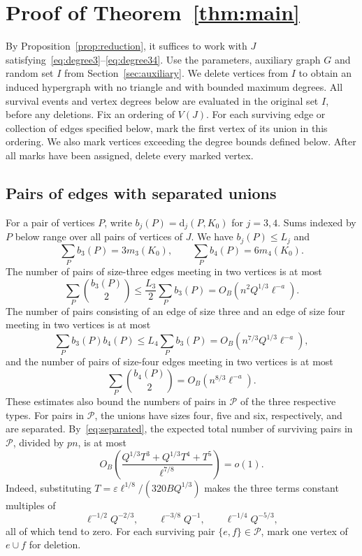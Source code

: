 \documentclass[11pt]{article}
\numberwithin{equation}{section}
\theoremstyle{remark}
\newcommand{\dd}{\mathrm d}
\begin{document}
\section{Proof of Theorem~\ref{thm:main}}\label{sec:completion}

By Proposition~\ref{prop:reduction}, it suffices to work with $J$ satisfying~\eqref{eq:degree3}--\eqref{eq:degree34}. Use the parameters, auxiliary graph $G$ and random set $I$ from Section~\ref{sec:auxiliary}. We delete vertices from $I$ to obtain an induced hypergraph with no triangle and with bounded maximum degrees. All survival events and vertex degrees below are evaluated in the original set $I$, before any deletions. Fix an ordering of $V(J)$. For each surviving edge or collection of edges specified below, mark the first vertex of its union in this ordering. We also mark vertices exceeding the degree bounds defined below. After all marks have been assigned, delete every marked vertex.

\subsection{Pairs of edges with separated unions}
For a pair of vertices $P$, write $b_j(P)=\dd_j(P,K_0)$ for $j=3,4$. Sums indexed by $P$ below range over all pairs of vertices of $J$. We have $b_j(P)\le L_j$ and
\[
 \sum_P b_3(P)=3m_3(K_0),\qquad
 \sum_P b_4(P)=6m_4(K_0).
\]
The number of pairs of size-three edges meeting in two vertices is at most
\[
 \sum_P\binom{b_3(P)}2
 \le\frac{L_3}{2}\sum_Pb_3(P)
 =O_B(n^2Q^{1/3}\ell^{-a}).
\]
The number of pairs consisting of an edge of size three and an edge of size four meeting in two vertices is at most
\[
 \sum_Pb_3(P)b_4(P)
 \le L_4\sum_Pb_3(P)
 =O_B(n^{7/3}Q^{1/3}\ell^{-a}),
\]
and the number of pairs of size-four edges meeting in two vertices is at most
\[
 \sum_P\binom{b_4(P)}2
 =O_B(n^{8/3}\ell^{-a}).
\]
These estimates also bound the numbers of pairs in $\mathcal P$ of the three respective types. For pairs in $\mathcal P$, the unions have sizes four, five and six, respectively, and are separated. By~\eqref{eq:separated}, the expected total number of surviving pairs in $\mathcal P$, divided by $pn$, is at most
\begin{equation}\label{eq:separated-loss}
 O_B\!\left(
 \frac{Q^{1/3}T^3+Q^{1/3}T^4+T^5}{\ell^{7/8}}
 \right)=o(1).
\end{equation}
Indeed, substituting $T=\varepsilon\ell^{1/8}/(320BQ^{1/3})$ makes the three terms constant multiples of
\[
 \ell^{-1/2}Q^{-2/3},\qquad
 \ell^{-3/8}Q^{-1},\qquad
 \ell^{-1/4}Q^{-5/3},
\]
all of which tend to zero. For each surviving pair $\{e,f\}\in\mathcal P$, mark one vertex of $e\cup f$ for deletion.
\end{document}

